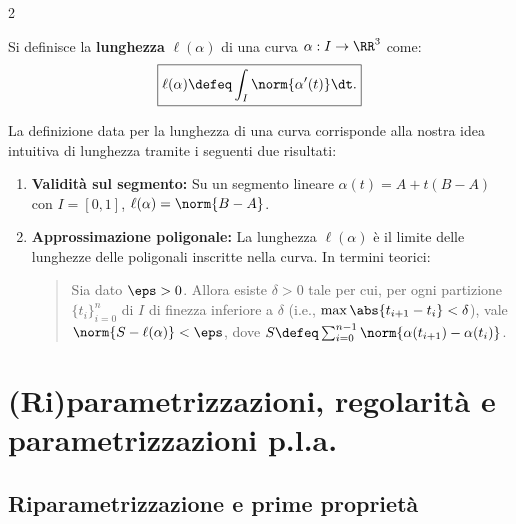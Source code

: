 \begin{multicols*}{2}
    \begin{definition}
        Si definisce la \textbf{lunghezza} $\ell(\alpha)$ di una curva
        $\alpha : I \to \RR^3$ come:
        \[
            \boxed{\ell(\alpha) \defeq \int_I \norm{\alpha'(t)} \dt.}
        \]
    \end{definition}

    \begin{remark}
        La definizione data per la lunghezza di una curva corrisponde alla nostra
        idea intuitiva di lunghezza tramite i seguenti due risultati:

        \begin{enumerate}
            \item \textbf{Validità sul segmento:} Su un segmento lineare $\alpha(t) = A + t(B-A)$ con $I = [0, 1]$,
                  $\ell(\alpha) = \norm{B-A}$.
            \item \textbf{Approssimazione poligonale:} La lunghezza $\ell(\alpha)$ è il limite delle lunghezze delle poligonali
                  inscritte nella curva. In termini teorici:

                  \begin{quote}
                      Sia dato $\eps > 0$. Allora esiste $\delta > 0$ tale per cui, per ogni partizione $\{t_i\}_{i=0}^n$
                      di $I$ di finezza inferiore a $\delta$ (i.e., $\max \abs{t_{i+1} - t_i} < \delta$), vale $\norm{S - \ell(\alpha)} < \eps$,
                      dove $S \defeq \sum_{i=0}^{n-1} \norm{\alpha(t_{i+1}) - \alpha(t_{i})}$.
                  \end{quote}
        \end{enumerate}
    \end{remark}

    \section{(Ri)parametrizzazioni, regolarità e parametrizzazioni p.l.a.}

    \subsection{Riparametrizzazione e prime proprietà}


\end{multicols*}
